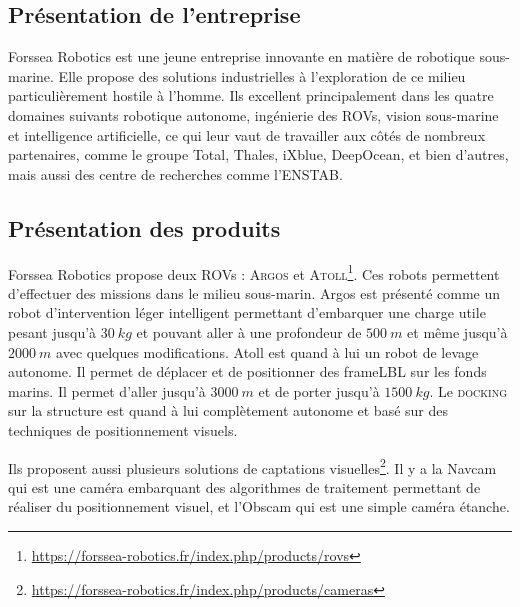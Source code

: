 \subsection{Présentation de l'entreprise}
    Forssea Robotics est une jeune entreprise innovante en matière de robotique sous-marine. Elle propose des solutions industrielles à l'exploration de ce milieu particulièrement hostile à l'homme. Ils excellent principalement dans les quatre domaines suivants robotique autonome, ingénierie des \gls{ROV}s, vision sous-marine et intelligence artificielle, ce qui leur vaut de travailler aux côtés de nombreux partenaires, comme le groupe Total, Thales, iXblue, DeepOcean, et bien d'autres, mais aussi des centre de recherches comme l'\gls{ENSTAB}.

\subsection{Présentation des produits}
    Forssea Robotics propose deux \gls{ROV}s : \textsc{Argos} et \textsc{Atoll}\footnote{\url{https://forssea-robotics.fr/index.php/products/rovs}}. Ces robots permettent d'effectuer des missions dans le milieu sous-marin. \gls{Argos} est présenté comme un robot d'intervention léger intelligent permettant d'embarquer une charge utile pesant jusqu'à $30\ kg$ et pouvant aller à une profondeur de $500\ m$ et même jusqu'à $2000\ m$ avec quelques modifications. \gls{Atoll} est quand à lui un robot de levage autonome. Il permet de déplacer et de positionner des \gls{frameLBL} sur les fonds marins. Il permet d'aller jusqu'à $3000\ m$ et de porter jusqu'à $1500\ kg$. Le \textsc{docking} sur la structure est quand à lui complètement autonome et basé sur des techniques de positionnement visuels.

    Ils proposent aussi plusieurs solutions de captations visuelles\footnote{\url{https://forssea-robotics.fr/index.php/products/cameras}}. Il y a la \gls{Navcam} qui est une caméra embarquant des algorithmes de traitement permettant de réaliser du positionnement visuel, et l'\gls{Obscam} qui est une simple caméra étanche.